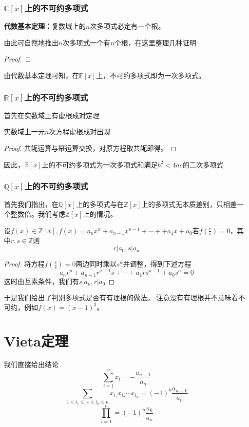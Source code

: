 \documentclass{ctexart}
\begin{document}
\subsubsection{$\mathbb C[x]$上的不可约多项式}
\begin{theorem}
    \textbf{代数基本定理：}复数域上的$n$次多项式必定有一个根。
\end{theorem}
由此可自然地推出$n$次多项式一个有$n$个根，在这里整理几种证明

\begin{proof}
    
\end{proof}

由代数基本定理可知，在$\mathbb F[x]$上，不可约多项式即为一次多项式。
\subsubsection{$\mathbb R[x]$上的不可约多项式}
首先在实数域上有虚根成对定理
\begin{theorem}
    实数域上一元$n$次方程虚根成对出现
\end{theorem}
\begin{proof}
    共轭运算与幂运算交换，对原方程取共轭即得。
\end{proof}

因此，$\mathbb R[x]$上的不可约多项式为一次多项式和满足$b^2 < 4ac$的二次多项式

\subsubsection{$\mathbb Q[x]$上的不可约多项式}
首先我们指出，在$\mathbb Q[x]$上的多项式与在$\mathbb Z[x]$上的多项式无本质差别，只相差一个整数倍。我们考虑$\mathbb Z[x]$上的情况。
\begin{theorem}
    设$f(x) \in \mathbb Z[x], f(x) = a_nx^n + a_{n - 1}x^{n - 1} + \cdots + +a_1 x + a_0$若$f(\frac rs) = 0$，其中$r,s \in \mathbb Z$则
    $$r | a_0 , s | a_n$$
\end{theorem}
\begin{proof}
    将方程$f(\frac rs) = 0$两边同时乘以$s^n$并调整，得到下述方程
    $$a_nr^n + a_{n - 1} r^{n-1} s + \cdots + a_1 r s^{n - 1} + a_0 s^n = 0$$
    这时由互素条件，我们有$s | a_n, r | a_0$
\end{proof}

于是我们给出了判别多项式是否有有理根的做法。
注意没有有理根并不意味着不可约，例如$f(x) = (x - 1) ^3$。

\section{Vieta定理}
我们直接给出结论
$$\sum_{i = 1}^{n} x_i = - \frac{a_{n-1}}{a_n}$$
$$\sum_{1 \leq i_1 \leq \cdots \leq i_k \leq n} x_{i_1}x_{i_2}\cdots x_{i_n} = (-1)^k \frac{a_{n - k}}{a _ n}$$
$$\prod_{i = 1}^n = (-1)^n \frac{a_0}{a_n}$$
\end{document}
